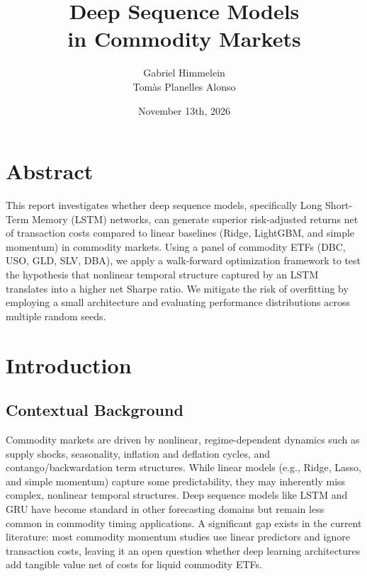 \documentclass[a4paper,oneside]{scrbook}
\begin{document}
\makeatletter
\renewcommand\thesection{\arabic{section}}
\renewcommand\thesubsection{\arabic{section}.\arabic{subsection}}
\renewcommand\thesubsubsection{\arabic{section}.\arabic{subsection}.\arabic{subsubsection}}
\makeatother

\subject{Portfolio Management and Trading \\ Project Report} 
\title{Deep Sequence Models\\in Commodity Markets}
\author{
  Gabriel Himmelein\\
  Tomàs Planelles Alonso\\
} \date{November 13th, 2026}
\publishers{{\small Submitted to}\\
  Sylvain Champonnois\\}
\maketitle

\section{Abstract}
This report investigates whether deep sequence models, specifically Long Short-Term Memory (LSTM) networks, can generate superior risk-adjusted returns net of transaction costs compared to linear baselines (Ridge, LightGBM, and simple momentum) in commodity markets. Using a panel of commodity ETFs (DBC, USO, GLD, SLV, DBA), we apply a walk-forward optimization framework to test the hypothesis that nonlinear temporal structure captured by an LSTM translates into a higher net Sharpe ratio. We mitigate the risk of overfitting by employing a small architecture and evaluating performance distributions across multiple random seeds.

\section{Introduction}

\subsection{Contextual Background}
Commodity markets are driven by nonlinear, regime-dependent dynamics such as supply shocks, seasonality, inflation and deflation cycles, and contango/backwardation term structures. While linear models (e.g., Ridge, Lasso, and simple momentum) capture some predictability, they may inherently miss complex, nonlinear temporal structures. Deep sequence models like LSTM and GRU have become standard in other forecasting domains but remain less common in commodity timing applications. A significant gap exists in the current literature: most commodity momentum studies use linear predictors and ignore transaction costs, leaving it an open question whether deep learning architectures add tangible value net of costs for liquid commodity ETFs.
\end{document}
